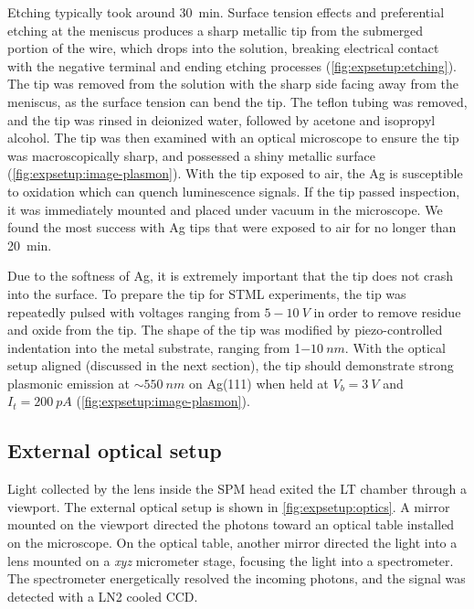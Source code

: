 Etching typically took around \SI{30}{min}. Surface tension effects and preferential etching at the meniscus produces a sharp metallic tip from the submerged portion of the wire, which drops into the solution, breaking electrical contact with the negative terminal and ending etching processes (\autoref{fig:expsetup:etching}). The tip was removed from the solution with the sharp side facing away from the meniscus, as the surface tension can bend the tip. The teflon tubing was removed, and the tip was rinsed in deionized water, followed by acetone and isopropyl alcohol. The tip was then examined with an optical microscope to ensure the tip was macroscopically sharp, and possessed a shiny metallic surface (\autoref{fig:expsetup:image-plasmon}). With the tip exposed to air, the Ag is susceptible to oxidation which can quench luminescence signals. If the tip passed inspection, it was immediately mounted and placed under vacuum in the microscope. We found the most success with Ag tips that were exposed to air for no longer than \SI{20}{min}.

Due to the softness of Ag, it is extremely important that the tip does not crash into the surface. To prepare the tip for \ac{STML} experiments, the tip was repeatedly pulsed with voltages ranging from $5-\SI{10}{V}$ in order to remove residue and oxide from the tip. The shape of the tip was modified by piezo-controlled indentation into the metal substrate, ranging from 1$\SI{-10}{nm}$. With the optical setup aligned (discussed in the next section), the tip should demonstrate strong plasmonic emission at $\sim \SI{550}{nm}$ on Ag(111) when held at $V_b =\SI{3}{V}$ and $I_t = \SI{200}{pA}$ (\autoref{fig:expsetup:image-plasmon}).

\begin{figure} [h]
    \centering
    \caption{}
    \label{fig:expsetup:image-plasmon}
\end{figure}




\subsection{External optical setup}

Light collected by the lens inside the \ac{SPM} head exited the \ac{LT} chamber through a viewport. The external optical setup is shown in \autoref{fig:expsetup:optics}. A mirror mounted on the viewport directed the photons toward an optical table installed on the microscope. On the optical table, another mirror directed the light into a lens mounted on a \textit{xyz} micrometer stage, focusing the light into a spectrometer. The spectrometer energetically resolved the incoming photons, and the signal was detected with a \ac{LN2} cooled \ac{CCD}. 

